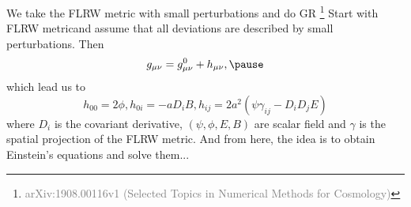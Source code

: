 \documentclass[aspectratio=169, 12pt]{beamer}
\newcommand{\gray}[1]{\textcolor{gray}{#1}}
\begin{document}
\begin{frame}{We take the FLRW metric with small perturbations and do GR \footnote{\tiny{\gray{arXiv:1908.00116v1 (Selected Topics in Numerical Methods for Cosmology)}}}}
Start with FLRW metricand assume that all deviations are described by small perturbations. Then\pause
\begin{displaymath}
  g_{\mu\nu} = g_{\mu\nu}^{0} + h_{\mu\nu},\pause
\end{displaymath}
which lead us to
\begin{displaymath}
  h_{00} = 2\phi, h_{0i} = -a D_i B,  h_{ij} = 2a^2(\psi\gamma_{ij} -D_iD_jE)
\end{displaymath}
where $D_i$ is the covariant derivative, $(\psi,\phi,E, B)$ are scalar field and $\gamma$ is the spatial projection of the FLRW metric. \pause\alert{And from here, the idea is to obtain Einstein's equations and solve them...}
\end{frame}
\end{document}
